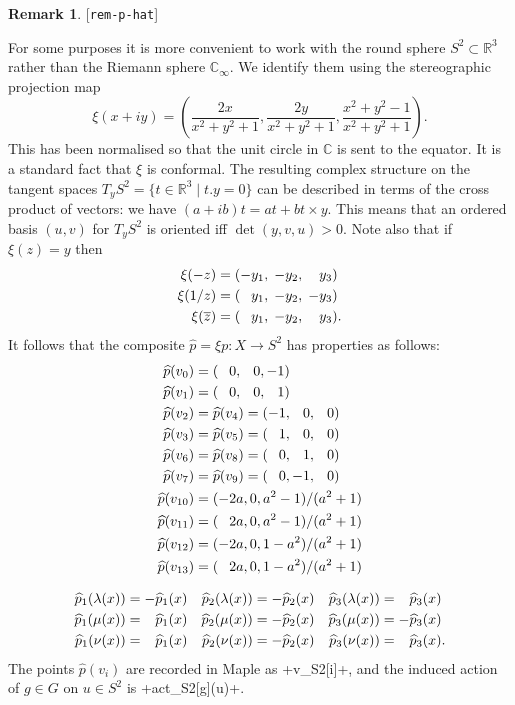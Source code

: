 \documentclass[reqno]{amsart}
\newcommand{\lbl}[1]{\label{#1}\textup{[\texttt{#1}]}\par}
\newcommand{\lbl}{\label}
\newcommand{\lm}        {\lambda}
\newcommand{\R}         {{\mathbb{R}}}
\newcommand{\C}         {{\mathbb{C}}}
\newcommand{\ov}[1]     {\overline{#1}}
\newcommand{\st}        {\;|\;}
\newcommand{\tm}        {\times}
\newcommand{\hp}        {\widehat{p}}
\newcommand{\pp}        {\hphantom{+}}
\renewcommand{\:}{\colon}
\theoremstyle{definition}
\newtheorem{remark}[theorem]{Remark}
\begin{document}
\begin{remark}\lbl{rem-p-hat}
 For some purposes it is more convenient to work with the round sphere
 $S^2\subset\R^3$ rather than the Riemann sphere $\C_\infty$.  We
 identify them using the stereographic projection map
 \[ \xi(x+iy) =
     \left(
      \frac{2x}{x^2+y^2+1},
      \frac{2y}{x^2+y^2+1},
      \frac{x^2+y^2-1}{x^2+y^2+1}
     \right).
 \]
 This has been normalised so that the unit circle in $\C$ is sent to
 the equator.  It is a standard fact that $\xi$ is conformal.  The
 resulting complex structure on the tangent spaces
 $T_yS^2=\{t\in\R^3\st t.y=0\}$ can be described in terms of the cross
 product of vectors: we have $(a+ib)t=at+bt\tm y$.  This means that an
 ordered basis $(u,v)$ for $T_yS^2$ is oriented iff $\det(y,v,u)>0$.
 Note also that if $\xi(z)=y$ then
 \begin{align*}
  \xi(-z)     &= (  - y_1,\; - y_2,\; \pp y_3) \\
  \xi(1/z)    &= (\pp y_1,\; - y_2,\;   - y_3) \\
  \xi(\ov{z}) &= (\pp y_1,\; - y_2,\; \pp y_3).
 \end{align*}
 It follows that the composite $\hp=\xi p\:X\to S^2$ has properties as
 follows:
 \begin{align*}
  \hp(v_0) &= (\pp 0,\pp 0,   -1) \\
  \hp(v_1) &= (\pp 0,\pp 0,\pp 1) \\
  \hp(v_2) &= \hp(v_4) = (  - 1,\pp 0,\pp 0) \\
  \hp(v_3) &= \hp(v_5) = (\pp 1,\pp 0,\pp 0) \\
  \hp(v_6) &= \hp(v_8) = (\pp 0,\pp 1,\pp 0) \\
  \hp(v_7) &= \hp(v_9) = (\pp 0,  - 1,\pp 0) \\
  \hp(v_{10}) &= (  - 2a,0,a^2-1)/(a^2+1) \\
  \hp(v_{11}) &= (\pp 2a,0,a^2-1)/(a^2+1) \\
  \hp(v_{12}) &= (  - 2a,0,1-a^2)/(a^2+1) \\
  \hp(v_{13}) &= (\pp 2a,0,1-a^2)/(a^2+1)
 \end{align*}

 \begin{align*}
  \hp_1(\lm(x)) &=   -\hp_1(x) & \hp_2(\lm(x)) &=   -\hp_2(x) & \hp_3(\lm(x)) &= \pp\hp_3(x) \\
  \hp_1(\mu(x)) &= \pp\hp_1(x) & \hp_2(\mu(x)) &=   -\hp_2(x) & \hp_3(\mu(x)) &=   -\hp_3(x) \\
  \hp_1(\nu(x)) &= \pp\hp_1(x) & \hp_2(\nu(x)) &=   -\hp_2(x) & \hp_3(\nu(x)) &= \pp\hp_3(x).
 \end{align*}
 The points $\hp(v_i)$ are recorded in Maple as \mcode+v_S2[i]+, and
 the induced action of $g\in G$ on $u\in S^2$ is \mcode+act_S2[g](u)+.
\end{remark}
\end{document}
